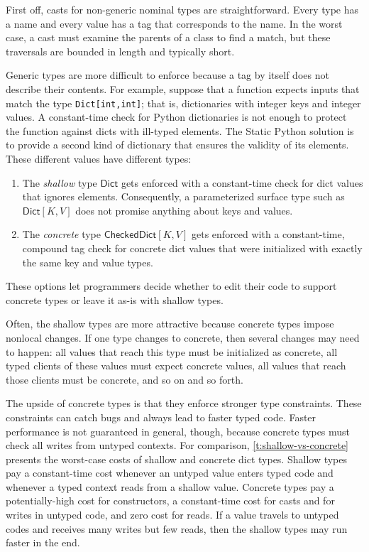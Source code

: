 \documentclass[english,cleveref,submission]{programming}
\newcommand{\SP}{Static Python}
\newcommand{\code}[1]{\texttt{#1}}
\newcommand{\typefont}[1]{\mathsf{#1}}
\newcommand{\paramtype}[2]{#1[#2]}
\newcommand{\sptrawpydict}{\typefont{Dict}}
\newcommand{\sptrawchkdict}{\typefont{CheckedDict}} %
\newcommand{\sptpydict}[2]{\paramtype{\sptrawpydict}{#1, #2}}
\newcommand{\sptchkdict}[2]{\paramtype{\sptrawchkdict}{#1, #2}}
\begin{document}
First off, casts for non-generic nominal types are straightforward.
Every type has a name and every value has a tag that corresponds to the name.
In the worst case, a cast must examine the parents of a class to find a match,
but these traversals are bounded in length and typically short.

Generic types are more difficult to enforce because a tag by itself does not
describe their contents.
For example, suppose that a function expects inputs that match
the type \code{Dict[int,int]}; that is, dictionaries with integer keys and
integer values.
A constant-time check for Python dictionaries is not enough to protect the
function against dicts with ill-typed elements.
The \SP{} solution is to provide a second kind of dictionary that ensures
the validity of its elements.
These different values have different types:
\begin{enumerate}
  \item
    The \emph{shallow} type $\sptrawpydict$ gets enforced with a constant-time check
    for dict values that ignores elements.
    Consequently, a parameterized surface type such as $\sptpydict{K}{V}$
    does not promise anything about keys and values.
  \item
    The \emph{concrete} type $\sptchkdict{K}{V}$ gets enforced with a constant-time,
    compound tag check for concrete dict values that were initialized with
    exactly the same key and value types.
\end{enumerate}
%
These options let programmers decide whether to edit their code to support concrete types
or leave it as-is with shallow types.

Often, the shallow types are more attractive because concrete types impose
nonlocal changes.
If one type changes to concrete, then several changes may need to happen:
all values that reach this type must be initialized as concrete,
all typed clients of these values must expect concrete values,
all values that reach those clients must be concrete,
and so on and so forth.

The upside of concrete types is that they enforce stronger type constraints.
These constraints can catch bugs and always lead to faster typed code.
Faster performance is not guaranteed in general, though, because concrete types must
check all writes from untyped contexts.
For comparison, \cref{t:shallow-vs-concrete} presents the worst-case costs of
shallow and concrete dict types.
Shallow types pay a constant-time cost whenever an untyped value enters typed code
and whenever a typed context reads from a shallow value.
Concrete types pay a potentially-high cost for constructors,
a constant-time cost for casts and for writes in untyped code,
and zero cost for reads.
If a value travels to untyped codes and receives many writes but few reads,
then the shallow types may run faster in the end.
\end{document}
